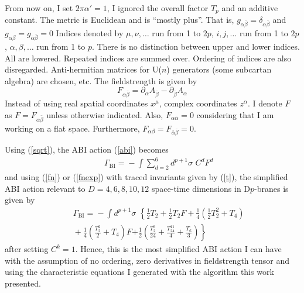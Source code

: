 \documentclass[a4paper,twocolumn]{article}
\begin{document}
From now on, I set $2\pi\alpha'=1$, I ignored the overall factor
$T_p$ and an additive constant. The metric is Euclidean and is
``mostly plus''. That is,
$g_{\alpha\bar{\beta}}=\delta_{\alpha\bar{\beta}}$ and
$g_{\alpha\beta}=g_{\bar{\alpha}\bar{\beta}}=0$ Indices denoted by
$\mu,\nu,\ldots$ run from 1 to 2$p$, $i,j,\ldots$ run from 1 to
$2p$, $\alpha,\beta,\ldots$ run from 1 to $p$. There is no
distinction between upper and lower indices. All are lowered.
Repeated indices are summed over. Ordering of indices are also
disregarded. Anti-hermitian matrices for U($n$) generators (some
subcartan algebra) are chosen, etc. The fieldstrength is given by
\begin{equation}
    F_{{\alpha}{\bar{\beta}}}=\partial_{\alpha}A_{\bar{\beta}}-\partial_{\bar{\beta}}A_{\alpha}
\end{equation}
Instead of using real spatial coordinates $x^{\mu}$, complex
coordinates $z^{\alpha}$. I denote $F$ as
$F=F_{\alpha\bar{\beta}}$ unless otherwise indicated. Also,
$F_{\alpha\bar{\alpha}}=0$ considering that I am working on a flat
space. Furthermore,
$F_{\alpha\beta}=F_{\bar{\alpha}\bar{\beta}}=0$.

Using (\ref{sqrt}), the ABI action (\ref{abi}) becomes
\begin{eqnarray}
    &&\!\!\!\!\!\!\!\!\!\!\!\!\!\!\!\!\!\!\!\!\!\!
    \Gamma_{\mathrm{BI}}
    \!=\!-\!\!\int\!
        \sum^{6}_{d=2}d^{p+1}\sigma \,\,C^d F^d
\end{eqnarray}
and using (\ref{fn}) or (\ref{fnexp}) with traced invariants given
by (\ref{t}), the simplified ABI action relevant to
$D=4,6,8,10,12$ space-time dimensions in D$p$-branes is given by
\begin{eqnarray}
    &&\!\!\!\!\!\!\!\!\!\!\!\!\!\!\!\!\!\!\!\!\!\!
    \Gamma_{\mathrm{BI}}
    \!\!=\!-\!\!\int d^{p+1}\sigma\,\,%
    \left\{
        \frac{1}{2}T_2+\frac{1}{2}T_2F
    \right.
    +\frac{1}{4}
    \left(
    \frac{1}{2}T^2_2
        +T_4
    \right)
    \nonumber\\&&
    \!\!\!\!\!\!\!\!\!\!\!\!\!\!\!\!
    +
    \frac{1}{4}
    \left(
    \frac{T^2_2}{2}
        +T_4
    \right)F
    \left.
    +\frac{1}{2}
    \left(
    \frac{T^3_2}{24}+\frac{T^{11}_{24}}{4}+\frac{T_6}{3}
    \right)
    \right\}\label{simp}
\end{eqnarray}
after setting $C^k=1$. Hence, this is the most simplified ABI
action I can have with the assumption of no ordering, zero
derivatives in fieldstrength tensor and using the characteristic
equations I generated with the algorithm this work presented.
\end{document}
